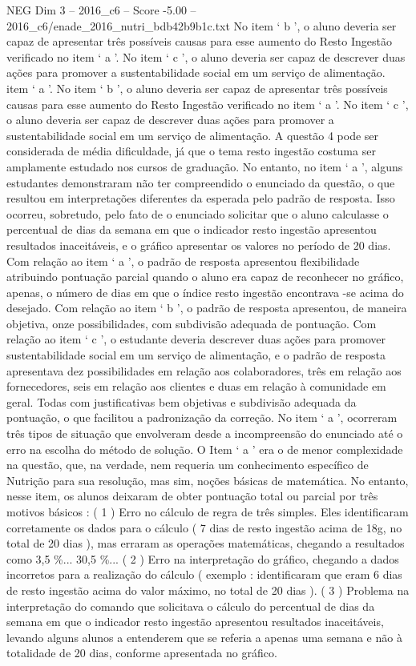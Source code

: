 \begin{textsample}{NEG Dim 3 – 2016\_c6 – Score -5.00 – 2016\_c6/enade\_2016\_nutri\_bdb42b9b1c.txt}
No item ‘ b ’, o aluno deveria ser capaz de apresentar três possíveis causas para esse aumento do Resto Ingestão verificado no item ‘ a ’.
No item ‘ c ’, o aluno deveria ser capaz de descrever duas ações para promover a sustentabilidade social em um serviço de alimentação. item ‘ a ’.
No item ‘ b ’, o aluno deveria ser capaz de apresentar três possíveis causas para esse aumento do Resto Ingestão verificado no item ‘ a ’.
No item ‘ c ’, o aluno deveria ser capaz de descrever duas ações para promover a sustentabilidade social em um serviço de alimentação.
A questão 4 pode ser considerada de média dificuldade, já que o tema resto ingestão costuma ser amplamente estudado nos cursos de graduação.
No entanto, no item ‘ a ’, alguns estudantes demonstraram não ter compreendido o enunciado da questão, o que resultou em interpretações diferentes da esperada pelo padrão de resposta.
Isso ocorreu, sobretudo, pelo fato de o enunciado solicitar que o aluno calculasse o percentual de dias da semana em que o indicador resto ingestão apresentou resultados inaceitáveis, e o gráfico apresentar os valores no período de 20 dias.
Com relação ao item ‘ a ’, o padrão de resposta apresentou flexibilidade atribuindo pontuação parcial quando o aluno era capaz de reconhecer no gráfico, apenas, o número de dias em que o índice resto ingestão encontrava -se acima do desejado.
Com relação ao item ‘ b ’, o padrão de resposta apresentou, de maneira objetiva, onze possibilidades, com subdivisão adequada de pontuação.
Com relação ao item ‘ c ’, o estudante deveria descrever duas ações para promover sustentabilidade social em um serviço de alimentação, e o padrão de resposta apresentava dez possibilidades em relação aos colaboradores, três em relação aos fornecedores, seis em relação aos clientes e duas em relação à comunidade em geral.
Todas com justificativas bem objetivas e subdivisão adequada da pontuação, o que facilitou a padronização da correção.
No item ‘ a ’, ocorreram três tipos de situação que envolveram desde a incompreensão do enunciado até o erro na escolha do método de solução.
O Item ‘ a ’ era o de menor complexidade na questão, que, na verdade, nem requeria um conhecimento específico de Nutrição para sua resolução, mas sim, noções básicas de matemática.
No entanto, nesse item, os alunos deixaram de obter pontuação total ou parcial por três motivos básicos : ( 1 ) Erro no cálculo de regra de três simples.
Eles identificaram corretamente os dados para o cálculo ( 7 dias de resto ingestão acima de 18g, no total de 20 dias ), mas erraram as operações matemáticas, chegando a resultados como 3,5 \%... 30,5 \%... ( 2 ) Erro na interpretação do gráfico, chegando a dados incorretos para a realização do cálculo ( exemplo : identificaram que eram 6 dias de resto ingestão acima do valor máximo, no total de 20 dias ). ( 3 ) Problema na interpretação do comando que solicitava o cálculo do percentual de dias da semana em que o indicador resto ingestão apresentou resultados inaceitáveis, levando alguns alunos a entenderem que se referia a apenas uma semana e não à totalidade de 20 dias, conforme apresentada no gráfico.

\end{textsample}
